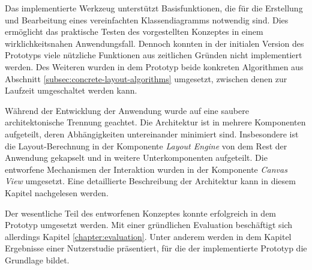 Das implementierte Werkzeug unterstützt Basisfunktionen, die für die Erstellung und Bearbeitung eines vereinfachten Klassendiagramms notwendig sind. Dies ermöglicht das praktische Testen des vorgestellten Konzeptes in einem wirklichkeitsnahen Anwendungsfall. Dennoch konnten in der initialen Version des Prototyps viele nützliche Funktionen aus zeitlichen Gründen nicht implementiert werden. Des Weiteren wurden in dem Prototyp beide konkreten Algorithmen aus Abschnitt \ref{subsec:concrete-layout-algorithms} umgesetzt, zwischen denen zur Laufzeit umgeschaltet werden kann.

Während der Entwicklung der Anwendung wurde auf eine saubere architektonische Trennung geachtet. Die Architektur ist in mehrere Komponenten aufgeteilt, deren Abhängigkeiten untereinander minimiert sind. Insbesondere ist die Layout-Berechnung in der Komponente \textit{Layout Engine} von dem Rest der Anwendung gekapselt und in weitere Unterkomponenten aufgeteilt. Die entworfene Mechanismen der Interaktion wurden in der Komponente \textit{Canvas View} umgesetzt. Eine detaillierte Beschreibung der Architektur kann in diesem Kapitel nachgelesen werden.

Der wesentliche Teil des entworfenen Konzeptes konnte erfolgreich in dem Prototyp umgesetzt werden. Mit einer gründlichen Evaluation beschäftigt sich allerdings Kapitel \ref{chapter:evaluation}. Unter anderem werden in dem Kapitel Ergebnisse einer Nutzerstudie präsentiert, für die der implementierte Prototyp die Grundlage bildet.
